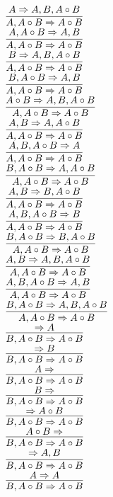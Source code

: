 \documentclass[11pt]{article}
\begin{document}
\begin{center}
\bigskip
\\$\infer{A, A\circ B\Rightarrow A\circ B}{A\Rightarrow A, B, A\circ B}$
\bigskip
\\$\infer{A, A\circ B\Rightarrow A\circ B}{A, A\circ B\Rightarrow A, B}$
\bigskip
\\$\infer{A, A\circ B\Rightarrow A\circ B}{B\Rightarrow A, B, A\circ B}$
\bigskip
\\$\infer{A, A\circ B\Rightarrow A\circ B}{B, A\circ B\Rightarrow A, B}$
\bigskip
\\$\infer{A, A\circ B\Rightarrow A\circ B}{A\circ B\Rightarrow A, B, A\circ B}$
\bigskip
\\$\infer{A, A\circ B\Rightarrow A\circ B}{A, B\Rightarrow A, A\circ B}$
\bigskip
\\$\infer{A, A\circ B\Rightarrow A\circ B}{A, B, A\circ B\Rightarrow A}$
\bigskip
\\$\infer{A, A\circ B\Rightarrow A\circ B}{B, A\circ B\Rightarrow A, A\circ B}$
\bigskip
\\$\infer{A, A\circ B\Rightarrow A\circ B}{A, B\Rightarrow B, A\circ B}$
\bigskip
\\$\infer{A, A\circ B\Rightarrow A\circ B}{A, B, A\circ B\Rightarrow B}$
\bigskip
\\$\infer{A, A\circ B\Rightarrow A\circ B}{B, A\circ B\Rightarrow B, A\circ B}$
\bigskip
\\$\infer{A, A\circ B\Rightarrow A\circ B}{A, B\Rightarrow A, B, A\circ B}$
\bigskip
\\$\infer{A, A\circ B\Rightarrow A\circ B}{A, B, A\circ B\Rightarrow A, B}$
\bigskip
\\$\infer{A, A\circ B\Rightarrow A\circ B}{B, A\circ B\Rightarrow A, B, A\circ B}$
\bigskip
\\$\infer{B, A\circ B\Rightarrow A\circ B}{\Rightarrow A}$
\bigskip
\\$\infer{B, A\circ B\Rightarrow A\circ B}{\Rightarrow B}$
\bigskip
\\$\infer{B, A\circ B\Rightarrow A\circ B}{A\Rightarrow }$
\bigskip
\\$\infer{B, A\circ B\Rightarrow A\circ B}{B\Rightarrow }$
\bigskip
\\$\infer{B, A\circ B\Rightarrow A\circ B}{\Rightarrow A\circ B}$
\bigskip
\\$\infer{B, A\circ B\Rightarrow A\circ B}{A\circ B\Rightarrow }$
\bigskip
\\$\infer{B, A\circ B\Rightarrow A\circ B}{\Rightarrow A, B}$
\bigskip
\\$\infer{B, A\circ B\Rightarrow A\circ B}{A\Rightarrow A}$

\end{center}
\end{document}
